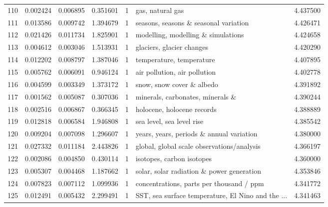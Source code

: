 \begin{tabular}{lrrrrlr}
110 &    0.002424 &  0.006895 &        0.351601 &           1 &                                   gas, natural gas &  4.437500 \\
111 &    0.013586 &  0.009742 &        1.394679 &           1 &              seasons, seasons \& seasonal variation &  4.426471 \\
112 &    0.021426 &  0.011734 &        1.825901 &           1 &                 modelling, modelling \& simulations &  4.424658 \\
113 &    0.004612 &  0.003046 &        1.513931 &           1 &                          glaciers, glacier changes &  4.420290 \\
114 &    0.012202 &  0.008797 &        1.387046 &           1 &                           temperature, temperature &  4.407895 \\
115 &    0.005762 &  0.006091 &        0.946124 &           1 &                       air pollution, air pollution &  4.402778 \\
116 &    0.004599 &  0.003349 &        1.373172 &           1 &                          snow, snow cover \& albedo &  4.391892 \\
117 &    0.001562 &  0.005087 &        0.307036 &           1 &                  minerals, carbonates, minerals \&  &  4.390244 \\
118 &    0.002516 &  0.006867 &        0.366345 &           1 &                         holocene, holocene records &  4.388889 \\
119 &    0.012818 &  0.006584 &        1.946808 &           1 &                          sea level, sea level rise &  4.385542 \\
120 &    0.009204 &  0.007098 &        1.296607 &           1 &           years, years, periods \& annual variation &  4.380000 \\
121 &    0.027332 &  0.011184 &        2.443826 &           1 &         global, global scale observations/analysis &  4.366197 \\
122 &    0.002086 &  0.004850 &        0.430114 &           1 &                          isotopes, carbon isotopes &  4.360000 \\
123 &    0.005307 &  0.004468 &        1.187662 &           1 &          solar, solar radiation \& power generation &  4.353846 \\
124 &    0.007823 &  0.007112 &        1.099936 &           1 &           concentrations, parts per thousand / ppm &  4.341772 \\
125 &    0.012491 &  0.005432 &        2.299491 &           1 &  SST, sea surface temperature, El Nino and the ... &  4.341463 \\

\end{tabular}
